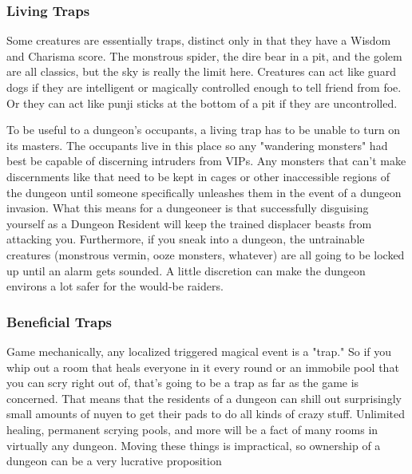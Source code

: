 \subsubsection{Living Traps}

Some creatures are essentially traps, distinct only in that they have a Wisdom and Charisma score. The monstrous spider, the dire bear in a pit, and the golem are all classics, but the sky is really the limit here. Creatures can act like guard dogs if they are intelligent or magically controlled enough to tell friend from foe. Or they can act like punji sticks at the bottom of a pit if they are uncontrolled.

To be useful to a dungeon's occupants, a living trap has to be unable to turn on its masters. The occupants live in this place so any "wandering monsters" had best be capable of discerning intruders from VIPs. Any monsters that can't make discernments like that need to be kept in cages or other inaccessible regions of the dungeon until someone specifically unleashes them in the event of a dungeon invasion. What this means for a dungeoneer is that successfully disguising yourself as a Dungeon Resident will keep the trained displacer beasts from attacking you. Furthermore, if you sneak into a dungeon, the untrainable creatures (monstrous vermin, ooze monsters, whatever) are all going to be locked up until an alarm gets sounded. A little discretion can make the dungeon environs a lot safer for the would-be raiders.

\subsubsection{Beneficial Traps}

Game mechanically, any localized triggered magical event is a "trap." So if you whip out a room that heals everyone in it every round or an immobile pool that you can scry right out of, that's going to be a trap as far as the game is concerned. That means that the residents of a dungeon can shill out surprisingly small amounts of nuyen to get their pads to do all kinds of crazy stuff. Unlimited healing, permanent scrying pools, and more will be a fact of many rooms in virtually any dungeon. Moving these things is impractical, so ownership of a dungeon can be a very lucrative proposition
